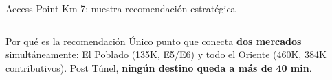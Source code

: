\documentclass[aspectratio=169, 11pt]{beamer}
\begin{document}
\begin{frame}{Access Point Km 7: nuestra recomendación estratégica}
\begin{columns}[T]

\vspace{4pt}
\begin{exampleblock}{\small Por qué es la recomendación}
\scriptsize
Único punto que conecta \textbf{dos mercados} simultáneamente: El Poblado (135K, E5/E6) y todo el Oriente (460K, 384K contributivos). Post Túnel, \textbf{ningún destino queda a más de 40 min}.
\end{exampleblock}
\end{columns}
\end{frame}

\end{document}
